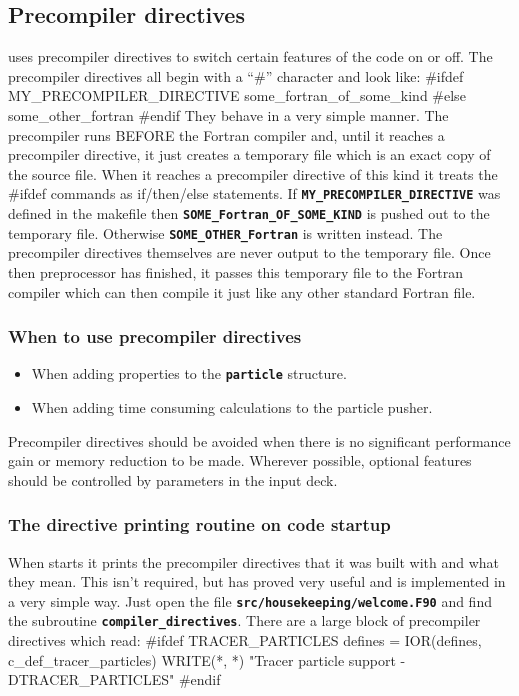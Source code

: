 \documentclass[12pt,a4paper]{article}
\newcommand{\inlinecode}[1]{{\color{warwickred} \bf\texttt{#1}}}
\newcommand{\EPOCH}{{\color{warwickdark}\fontfamily{phv}\selectfont{EPOCH}}}
\newenvironment{boxverbatim}{\lboxverbatim{none}}{\endlboxverbatim}
\begin{document}
\subsection{Precompiler directives}
{\EPOCH} uses precompiler directives to switch certain features of the code on
or off. The precompiler directives all begin with a ``\#'' character and look
like:
\begin{boxverbatim}
#ifdef MY_PRECOMPILER_DIRECTIVE
  some_fortran_of_some_kind
#else
  some_other_fortran
#endif
\end{boxverbatim}
They behave in a very simple manner. The precompiler runs BEFORE the
Fortran compiler and, until it reaches a precompiler directive, it just creates
a temporary file which is an exact copy of the source file. When it reaches a
precompiler directive of this kind it treats the \#ifdef commands as
if/then/else statements. If
\inlinecode{MY\_PRECOMPILER\_DIRECTIVE} was defined in the makefile then
\inlinecode{SOME\_Fortran\_OF\_SOME\_KIND} is pushed out to the temporary
file. Otherwise \inlinecode{SOME\_OTHER\_Fortran} is written instead.
The precompiler directives themselves are never output to the temporary
file. Once then preprocessor has finished, it passes this temporary file
to the Fortran compiler which can then compile it just like any other
standard Fortran file.

\subsubsection{When to use precompiler directives}
\begin{itemize}
\item When adding properties to the \inlinecode{particle} structure.
\item When adding time consuming calculations to the particle pusher.
\end{itemize}
Precompiler directives should be avoided when there is no significant
performance gain or memory reduction to be made. Wherever possible, optional
features should be controlled by parameters in the input deck.

\subsubsection{The directive printing routine on code startup}
When {\EPOCH} starts it prints the precompiler directives that it was built with
and what they mean. This isn't required, but has proved very useful and is
implemented in a very simple way. Just open the file
\inlinecode{src/housekeeping/welcome.F90} and find the subroutine
\inlinecode{compiler\_directives}. There are a large block of precompiler
directives which read:
\begin{boxverbatim}
#ifdef TRACER_PARTICLES
    defines = IOR(defines, c_def_tracer_particles)
    WRITE(*, *) "Tracer particle support -DTRACER_PARTICLES"
#endif
\end{boxverbatim}
\end{document}

